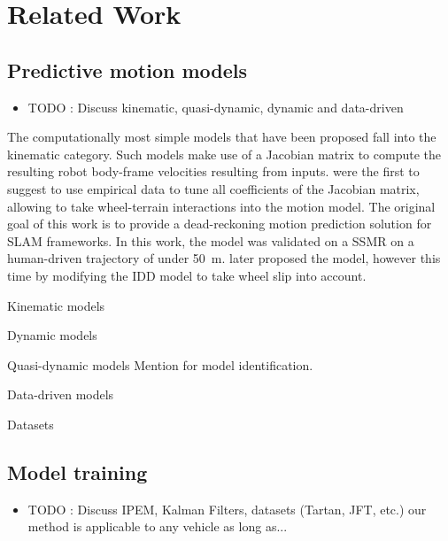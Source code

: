 \section{Related Work}

\lightlipsum[1]

\subsection{Predictive motion models}

\begin{itemize}
	\item TODO : Discuss kinematic, quasi-dynamic, dynamic and data-driven
\end{itemize}

The computationally most simple models that have been proposed fall into the kinematic category.
Such models make use of a Jacobian matrix to compute the resulting robot body-frame velocities resulting from inputs.
\citet{Anousaki2004} were the first to suggest to use empirical data to tune all coefficients of the Jacobian matrix, allowing to take wheel-terrain interactions into the motion model.
The original goal of this work is to provide a dead-reckoning motion prediction solution for \ac{SLAM} frameworks. 
In this work, the model was validated on a \ac{SSMR} on a human-driven trajectory of under \SI{50}{\meter}.
\citet{Mandow2007} later proposed the \ICRBASED model, however this time by modifying the \ac{IDD} model to take wheel slip into account. 


Kinematic models
\citep{Anousaki2004}
\citep{Mandow2007}
\citep{Wang2015}
\citep{Baril2020}

Dynamic models
\citep{Yu2009}
\citep{Seegmiller2016}
\citep{Yang2022}

Quasi-dynamic models
\citep{Seegmiller2014}
\citep{Ostafew2016}
\citep{Rabiee2019}
\citep{Takemura2021}
Mention \citep{Seegmiller2013} for model identification.

Data-driven models
\citep{Williams2018}
\citep{Nagariya2020}
\citep{Tremblay2021}

\lightlipsum[1-3]

Datasets
\citep{Triest2022}


\subsection{Model training}

\begin{itemize}
	\item TODO : Discuss IPEM, Kalman Filters, datasets (Tartan, JFT, etc.) our method is applicable to any vehicle as long as...
\end{itemize}

\lightlipsum[1-3]

